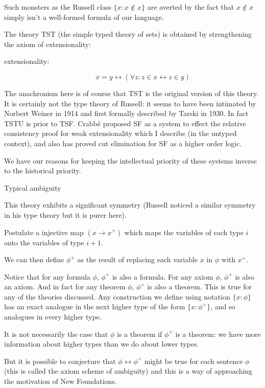 \documentclass{slides}
\begin{document}
\begin{slide}

Such monsters as the Russell class $\{x:x \not\in x\}$ are averted by the fact that $x \not\in x$ simply isn't a well-formed formula of our language.

The theory TST (the simple typed theory of sets) is obtained by strengthening the axiom of extensionality:

\begin{description}

\item[extensionality:]  $$x=y \leftrightarrow (\forall z:z \in x \leftrightarrow z \in y)$$

\end{description}

The anachronism here is of course that TST is the original version of this theory.  It is certainly not the type theory of Russell:  it seems to have been intimated by Norbert Weiner in 1914 and first formally described by Tarski in 1930.  In fact TSTU is prior to TSF.  Crabb\'e proposed SF as a system to effect the relative consistency proof for weak extensionality which I describe (in the untyped context), and also has proved cut elimination for SF as a higher order logic.

We have our reasons for keeping the intellectual priority of these systems inverse to the historical priority.


\end{slide}

\begin{slide}

{\Large Typical ambiguity}

This theory exhibits a significant symmetry (Russell noticed a similar symmetry in his type theory but it is purer here).

Postulate a injective map $(x \rightarrow x^+)$ which maps the variables of each type $i$ onto the variables of type $i+1$.

We can then define $\phi^+$ as the result of replacing each variable $x$ in $\phi$ with $x^+$.

Notice that for any formula $\phi$, $\phi^+$ is also a formula.  For any axiom $\phi$, $\phi^+$ is also an axiom.  And in fact for any theorem $\phi$, $\phi^+$ is also a theorem.   This is true for any of the theories discussed.  Any construction we define
using notation $\{x:\phi\}$ has an exact analogue in the next higher type of the form $\{x:\phi^+\}$, and so analogues in every higher type.

It is not necessarily the case that $\phi$ is a theorem if $\phi^+$ is a theorem:  we have more information about higher types than we do about lower types.

But it is possible to conjecture that $\phi \leftrightarrow \phi^+$ might be true for each sentence $\phi$ (this is called the axiom scheme of ambiguity) and this is a way of approaching the motivation of New Foundations.

\end{slide}
\end{document}
